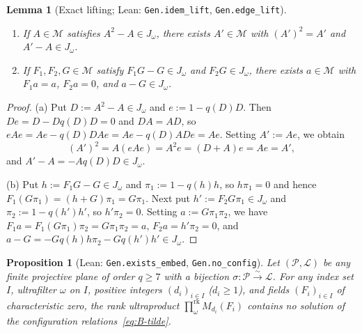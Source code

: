 \documentclass[11pt]{article}
\newtheorem{proposition}[theorem]{Proposition}
\newtheorem{lemma}[theorem]{Lemma}
\theoremstyle{definition}
\theoremstyle{remark}
\numberwithin{equation}{section}
\newcommand{\RUF}[3]{\prod_{#1}^{\mathrm{rk}} M_{#2}(#3)}
\newcommand{\PP}{\mathcal{P}}
\newcommand{\LL}{\mathcal{L}}
\newcommand{\1}{\mathbf{1}}
\newcommand{\code}[1]{{\normalfont\small\texttt{#1}}}
\begin{document}
\begin{lemma}[Exact lifting; Lean: \code{Gen.idem\_lift}, \code{Gen.edge\_lift}]
\label{lem:lifting}
\leavevmode
\begin{enumerate}[label=\textup{(\alph*)},leftmargin=2.2em]
\item If $A \in \mathcal{M}$ satisfies $A^2 - A \in J_\omega$, there exists $A' \in \mathcal{M}$ with $(A')^2 = A'$ and $A' - A \in J_\omega$.
\item If $F_1, F_2, G \in \mathcal{M}$ satisfy $F_1 G - G \in J_\omega$ and $F_2 G \in J_\omega$, there exists $a \in \mathcal{M}$ with $F_1 a = a$, $F_2 a = 0$, and $a - G \in J_\omega$.
\end{enumerate}
\end{lemma}

\begin{proof}
(a) Put $D := A^2 - A \in J_\omega$ and $e := 1 - q(D)D$. Then $De = D - D q(D) D = 0$ and $DA = AD$, so $eAe = Ae - q(D)DAe = Ae - q(D)ADe = Ae$. Setting $A' := Ae$, we obtain
\[
(A')^2 = A(eAe) = A^2 e = (D + A)e = Ae = A',
\]
and $A' - A = -A q(D) D \in J_\omega$.

(b) Put $h := F_1 G - G \in J_\omega$ and $\pi_1 := 1 - q(h)h$, so $h\pi_1 = 0$ and hence $F_1(G\pi_1) = (h + G)\pi_1 = G\pi_1$. Next put $h' := F_2 G \pi_1 \in J_\omega$ and $\pi_2 := 1 - q(h')h'$, so $h'\pi_2 = 0$. Setting $a := G\pi_1\pi_2$, we have $F_1 a = F_1(G\pi_1)\pi_2 = G\pi_1\pi_2 = a$, $F_2 a = h'\pi_2 = 0$, and $a - G = -G q(h)h\pi_2 - G q(h')h' \in J_\omega$.
\end{proof}

\begin{proposition}[Lean: \code{Gen.exists\_embed}, \code{Gen.no\_config}]
\label{prop:no-config}
Let $(\PP, \LL)$ be any finite projective plane of order $q \ge 7$ with a bijection $\sigma\colon \PP \xrightarrow{\sim} \LL$. For any index set $I$, ultrafilter $\omega$ on $I$, positive integers $(d_i)_{i \in I}$ ($d_i \ge 1$), and fields $(F_i)_{i \in I}$ of characteristic zero, the rank ultraproduct $\RUF{\omega}{d_i}{F_i}$ contains no solution of the configuration relations~\eqref{eq:B-tilde}.
\end{proposition}
\end{document}

